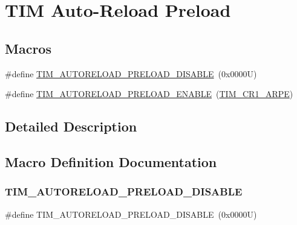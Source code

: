 \hypertarget{group___t_i_m___auto_reload_preload}{}\section{T\+IM Auto-\/\+Reload Preload}
\label{group___t_i_m___auto_reload_preload}
\subsection*{Macros}
\begin{DoxyCompactItemize}
\item 
\#define \hyperlink{group___t_i_m___auto_reload_preload_ga4d0cf7e2800d0ab10f3f0ebfac11c9c7}{T\+I\+M\+\_\+\+A\+U\+T\+O\+R\+E\+L\+O\+A\+D\+\_\+\+P\+R\+E\+L\+O\+A\+D\+\_\+\+D\+I\+S\+A\+B\+LE}~(0x0000\+U)
\item 
\#define \hyperlink{group___t_i_m___auto_reload_preload_gaaa36f0c74b1d1ec83b0c105bfedfa309}{T\+I\+M\+\_\+\+A\+U\+T\+O\+R\+E\+L\+O\+A\+D\+\_\+\+P\+R\+E\+L\+O\+A\+D\+\_\+\+E\+N\+A\+B\+LE}~(\hyperlink{group___peripheral___registers___bits___definition_ga4a3ad409f6b147cdcbafbfe29102f3fd}{T\+I\+M\+\_\+\+C\+R1\+\_\+\+A\+R\+PE})
\end{DoxyCompactItemize}


\subsection{Detailed Description}


\subsection{Macro Definition Documentation}
\mbox{\label{group___t_i_m___auto_reload_preload_ga4d0cf7e2800d0ab10f3f0ebfac11c9c7}} 
\subsubsection{\texorpdfstring{T\+I\+M\+\_\+\+A\+U\+T\+O\+R\+E\+L\+O\+A\+D\+\_\+\+P\+R\+E\+L\+O\+A\+D\+\_\+\+D\+I\+S\+A\+B\+LE}{TIM\_AUTORELOAD\_PRELOAD\_DISABLE}}
{\footnotesize\ttfamily \#define T\+I\+M\+\_\+\+A\+U\+T\+O\+R\+E\+L\+O\+A\+D\+\_\+\+P\+R\+E\+L\+O\+A\+D\+\_\+\+D\+I\+S\+A\+B\+LE~(0x0000\+U)}

